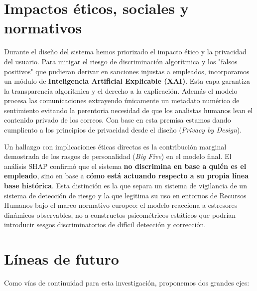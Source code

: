 \documentclass[IB]{TFUOC}%
\begin{document}
\section{Impactos éticos, sociales y normativos}
Durante el diseño del sistema hemos priorizado el impacto ético y la privacidad del usuario. Para mitigar el riesgo de discriminación algorítmica y los "falsos positivos" que pudieran derivar en sanciones injustas a empleados, incorporamos un módulo de \textbf{Inteligencia Artificial Explicable (XAI)}. Esta capa garantiza la transparencia algorítmica y el derecho a la explicación. Además el modelo procesa las comunicaciones extrayendo únicamente un metadato numérico de sentimiento evitando la perentoria necesidad de que los analistas humanos lean el contenido privado de los correos. Con base en esta premisa estamos dando cumpliento a los principios de privacidad desde el diseño (\textit{Privacy by Design}).

\medskip
\noindent Un hallazgo con implicaciones éticas directas es la contribución marginal demostrada de los rasgos de personalidad (\textit{Big Five}) en el modelo final. El análisis SHAP confirmó 
que el sistema \textbf{no discrimina en base a quién es el empleado}, sino en base a \textbf{cómo está actuando respecto a su propia línea base histórica}. Esta distinción es la que separa un sistema de vigilancia de un sistema de detección de riesgo y la que legitima 
su uso en entornos de Recursos Humanos bajo el marco normativo europeo: el modelo reacciona a estresores dinámicos observables, no a constructos psicométricos estáticos que podrían introducir sesgos discriminatorios de difícil detección y corrección.

\section{Líneas de futuro}
Como vías de continuidad para esta investigación, proponemos dos grandes ejes:
\end{document}
